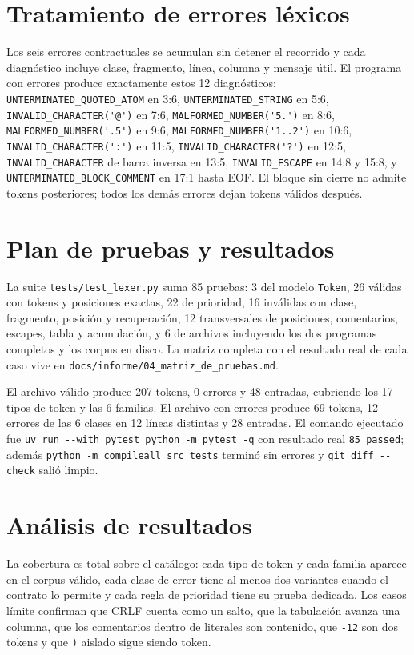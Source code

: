 \documentclass[11pt,a4paper]{article}
\begin{document}
\section{Tratamiento de errores léxicos}
Los seis errores contractuales se acumulan sin detener el recorrido y
cada diagnóstico incluye clase, fragmento, línea, columna y mensaje
útil. El programa con errores produce exactamente estos 12
diagnósticos: \verb|UNTERMINATED_QUOTED_ATOM| en 3:6,
\verb|UNTERMINATED_STRING| en 5:6, \verb|INVALID_CHARACTER('@')| en
7:6, \verb|MALFORMED_NUMBER('5.')| en 8:6,
\verb|MALFORMED_NUMBER('.5')| en 9:6, \verb|MALFORMED_NUMBER('1..2')|
en 10:6, \verb|INVALID_CHARACTER(':')| en 11:5,
\verb|INVALID_CHARACTER('?')| en 12:5, \verb|INVALID_CHARACTER| de
barra inversa en 13:5, \verb|INVALID_ESCAPE| en 14:8 y 15:8, y
\verb|UNTERMINATED_BLOCK_COMMENT| en 17:1 hasta EOF. El bloque sin
cierre no admite tokens posteriores; todos los demás errores dejan
tokens válidos después.

\section{Plan de pruebas y resultados}
La suite \verb|tests/test_lexer.py| suma 85 pruebas: 3 del modelo
\verb|Token|, 26 válidas con tokens y posiciones exactas, 22 de
prioridad, 16 inválidas con clase, fragmento, posición y
recuperación, 12 transversales de posiciones, comentarios, escapes,
tabla y acumulación, y 6 de archivos incluyendo los dos programas
completos y los corpus en disco. La matriz completa con el resultado
real de cada caso vive en \verb|docs/informe/04_matriz_de_pruebas.md|.

El archivo válido produce 207 tokens, 0 errores y 48 entradas,
cubriendo los 17 tipos de token y las 6 familias. El archivo con
errores produce 69 tokens, 12 errores de las 6 clases en 12 líneas
distintas y 28 entradas. El comando ejecutado fue
\verb|uv run --with pytest python -m pytest -q| con resultado real
\verb|85 passed|; además \verb|python -m compileall src tests| terminó sin errores y \verb|git diff --check| salió limpio.

\section{Análisis de resultados}
La cobertura es total sobre el catálogo: cada tipo de token y cada
familia aparece en el corpus válido, cada clase de error tiene al
menos dos variantes cuando el contrato lo permite y cada regla de
prioridad tiene su prueba dedicada. Los casos límite confirman que
CRLF cuenta como un salto, que la tabulación avanza una columna, que
los comentarios dentro de literales son contenido, que \verb|-12| son
dos tokens y que \verb|)| aislado sigue siendo token.
\end{document}
